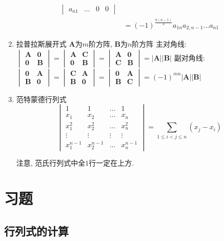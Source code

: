 \begin{enumerate}
\begin{equation*}
\begin{aligned}
\begin{vmatrix}
a_{n1} & \dots & 0 & 0
\end{vmatrix}\\ & =
(-1)^{\frac{n(n-1)}{2}}a_{1n}a_{2,n-1}\dots a_{n1}
\end{aligned}
\end{equation*}
\item 拉普拉斯展开式
\subitem $ \bm{A} $为$ m $阶方阵, $ \bm{B} $为$ n $阶方阵
\subitem 主对角线:
$ \begin{vmatrix}
  \bm{A} & \bm{0} \\
  \bm{0} & \bm{B}
\end{vmatrix} =
\begin{vmatrix}
\bm{A} & \bm{C} \\
\bm{0} & \bm{B}
\end{vmatrix} =
\begin{vmatrix}
\bm{A} & \bm{0} \\
\bm{C} & \bm{B}
\end{vmatrix} = |\bm{A}||\bm{B}|$
\subitem 副对角线:$
\begin{vmatrix}
\bm{0} & \bm{A} \\
\bm{B} & \bm{0}
\end{vmatrix} =
\begin{vmatrix}
\bm{C} & \bm{A} \\
\bm{B} & \bm{0}
\end{vmatrix} =
\begin{vmatrix}
\bm{0} & \bm{A} \\
\bm{B} & \bm{C}
\end{vmatrix} = (-1)^{mn}|\bm{A}||\bm{B}|$
\item 范特蒙德行列式
\begin{equation*}
\begin{vmatrix}
1 & 1 & \dots & 1 \\
x_1 & x_2 & \dots & x_n \\
x_1^2 & x_2^2 & \dots & x_n^2 \\
\vdots & \vdots  & \vdots & \vdots \\
x_{1}^{n-1} & x_{2}^{n-1} & \dots & x_{n}^{n-1}
\end{vmatrix} = \sum_{1\le i<j\le n}(x_{j}-x_{i})
\end{equation*}\par
注意, 范氏行列式中全$1$行一定在上方.
\end{enumerate}
\section{习题}
\subsection{行列式的计算}
